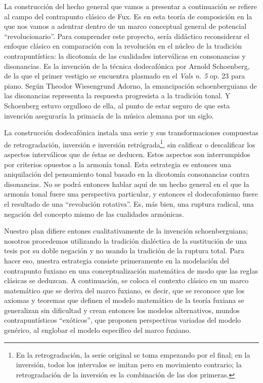 \documentclass[letterpaper,12pt]{book}
\theoremstyle{definition} \newtheorem{Def}{Definición}[chapter]
\theoremstyle{definition} \newtheorem{Teo}{Teorema}[chapter]
\theoremstyle{definition} \newtheorem{Pro}{Proposición}[chapter]
\theoremstyle{definition} \newtheorem{Lema}{Lema}[chapter]
\begin{document}
 La construcción del hecho general que vamos a presentar a continuación se refiere al campo del contrapunto clásico de Fux. Es en esta teoría de composición en la que nos vamos a adentrar dentro de un marco conceptual general de potencial ``revolucionario''. Para comprender este proyecto, sería didáctico reconsiderar el enfoque clásico en comparación con la revolución en el núcleo de la tradición contrapuntística: la dicotomía de las cualidades interválicas en consonancias y disonancias. Es la invención de la técnica dodecafónica por Arnold Schoenberg, de la que el primer vestigio se encuentra plasmado en el \emph{Vals n. 5} op. 23 para piano. Según Theodor Wiesengrund Adorno, la emancipación schoenberguiana de las disonancias representa la respuesta progresista a la tradición tonal. Y Schoenberg estuvo orgulloso de ella, al punto de estar seguro de que esta invención aseguraría la primacía de la música alemana por un siglo. 
 
 La construcción dodecafónica instala una serie y sus transformaciones compuestas de retrogradación, inversión e inversión retrógrada\footnote{En la retrogradación, la serie original se toma empezando por el final; en la inversión, todos los intervalos se imitan pero en movimiento contrario; la retrogradación de la inversión es la combinación de las dos primeras.}, sin calificar o descalificar los aspectos interválicos que de éstas se deducen. Estos aspectos son interrumpidos por criterios opuestos a la armonía tonal. Esta estrategia es entonces una aniquilación del pensamiento tonal basado en la dicotomía consonancias contra disonancias. No se podrá entonces hablar aquí de un hecho general en el que la armonía tonal fuere una perspectiva particular, y entonces el dodecafonismo fuere el resultado de una ``revolución rotativa''. Es, más bien, una ruptura radical, una negación del concepto mismo de las cualidades armónicas.
 
 Nuestro plan difiere entones cualitativamente de la invención schoenberguiana; nosotros procedemos utilizando la tradición dialéctica de la sustitución de una tesis por su doble negación y no usando la tradición de la ruptura total. Para hacer eso, nuestra estrategia consiste primeramente en la modelación del contrapunto fuxiano en una conceptualización matemática de modo que las reglas clásicas se deduzcan. A continuación, se coloca el contexto clásico en un marco matemático que se deriva del marco fuxiano, es decir, que se reconoce que los axiomas y teoremas que definen el modelo matemático de la teoría fuxiana se generalizan sin dificultad y crean entonces los modelos alternativos, mundos contrapuntísticos ``exóticos'', que proponen perspectivas variadas del modelo genérico, al englobar el modelo específico del marco fuxiano.
 
\end{document}
